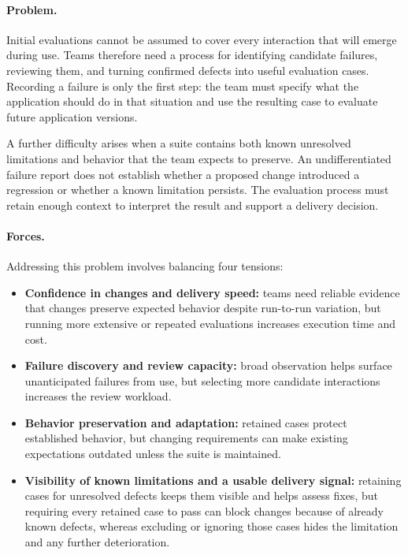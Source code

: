 
\paragraph{Problem.}
Initial evaluations cannot be assumed to cover every interaction that will
emerge during use. Teams therefore need a process for identifying candidate
failures, reviewing them, and turning confirmed defects into useful evaluation
cases. Recording a failure is only the first step: the team must specify what
the application should do in that situation and use the resulting case to
evaluate future application versions.

A further difficulty arises when a suite contains both known unresolved
limitations and behavior that the team expects to preserve. An undifferentiated
failure report does not establish whether a proposed change introduced a
regression or whether a known limitation persists. The evaluation process must
retain enough context to interpret the result and support a delivery decision.

\paragraph{Forces.}
\label{sec:cd4ai-forces}
Addressing this problem involves balancing four tensions:
\begin{itemize}
  \item \textbf{Confidence in changes and delivery speed:} teams need reliable
    evidence that changes preserve expected behavior despite run-to-run
    variation, but running more extensive or repeated evaluations increases
    execution time and cost.
  \item \textbf{Failure discovery and review capacity:} broad observation helps
    surface unanticipated failures from use, but selecting more candidate
    interactions increases the review workload.
  \item \textbf{Behavior preservation and adaptation:} retained cases protect
    established behavior, but changing requirements can make existing
    expectations outdated unless the suite is maintained.
  \item \textbf{Visibility of known limitations and a usable delivery signal:}
    retaining cases for unresolved defects keeps them visible and helps assess
    fixes, but requiring every retained case to pass can block changes because
    of already known defects, whereas excluding or ignoring those cases hides
    the limitation and any further deterioration.
\end{itemize}


